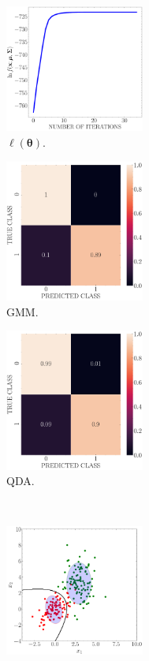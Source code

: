 \documentclass[12pt, a4 paper]{article}
\newcommand{\btheta}{\boldsymbol{\theta}}
\begin{document}
\begin{figure}[!htbp]
\centering
\quad
    \begin{subfigure}[!htbp]{0.24\textwidth}
       \centering
       \includegraphics[width=1.8in]{../results/ex1/loss_GMM_EM_dataset_P1b_size_199.pdf}
       \caption{$\ell(\btheta)$.}
       \label{fig:gmmLoss}
    \end{subfigure}
\quad \quad
    \begin{subfigure}[!htbp]{0.24\textwidth}
       \centering
       \includegraphics[width=1.8in]{../results/ex1/conf_mtx_GMM_EM_dataset_P1b_size_199.pdf}
       \caption{GMM.}
       \label{fig:GMM_P1b}
    \end{subfigure}
\quad \quad
    \begin{subfigure}[!htbp]{0.24\textwidth}
       \centering
       \includegraphics[width=1.8in]{../results/ex1/conf_mtx_QD_ML_dataset_P1b_size_199.pdf}
       \caption{QDA.}
       \label{fig:GMM_QDA_P1b}
    \end{subfigure}
\\
    \begin{subfigure}[!htbp]{0.24\textwidth}
       \centering
       \includegraphics[width=1.8in]{../results/ex1/samples_GMM_EM_dataset_P1b_size_199.pdf}

\end{subfigure}
\end{figure}
\end{document}
